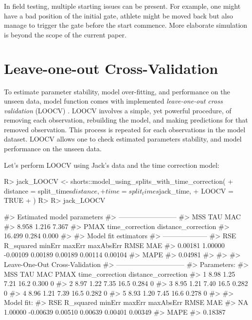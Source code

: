 \documentclass[
]{jss}
\begin{document}
In field testing, multiple starting issues can be present. For example, one might have a bad position of the initial gate, athlete might be moved back but also manage to trigger the gate before the start commence. More elaborate simulation is beyond the scope of the current paper.

\hypertarget{leave-one-out-cross-validation}{%
\section{Leave-one-out Cross-Validation}\label{leave-one-out-cross-validation}}

To estimate parameter stability, model over-fitting, and performance on the unseen data,  model function comes with implemented \emph{leave-one-out cross validation} (LOOCV) \citep{jamesIntroductionStatisticalLearning2017, jovanovicBmbstatsBootstrapMagnitudebased2020, kuhnAppliedPredictiveModeling2018}. LOOCV involves a simple, yet powerful procedure, of removing each observation, rebuilding the model, and making predictions for that removed observation. This process is repeated for each observations in the model dataset. LOOCV allows one to check estimated parameters stability, and model performance on the unseen data.

Let's perform LOOCV using Jack's data and the time correction model:

\begin{CodeChunk}
\begin{CodeInput}
R> jack_LOOCV <- shorts::model_using_splits_with_time_correction(
+   distance = split_times$distance,
+   time = split_times$jack_time,
+   LOOCV = TRUE
+ )
R> 
R> jack_LOOCV
\end{CodeInput}
\begin{CodeOutput}
#> Estimated model parameters
#> --------------------------
#>                 MSS                 TAU                 MAC 
#>               8.958               1.216               7.367 
#>                PMAX     time_correction distance_correction 
#>              16.499               0.284               0.000 
#> 
#> Model fit estimators
#> --------------------
#>       RSE R_squared    minErr    maxErr maxAbsErr      RMSE       MAE 
#>   0.00181   1.00000  -0.00109   0.00189   0.00189   0.00114   0.00104 
#>      MAPE 
#>   0.04981 
#> 
#> 
#> Leave-One-Out Cross-Validation
#> ------------------------------
#> Parameters:
#>    MSS  TAU  MAC PMAX time_correction distance_correction
#> 1 8.98 1.25 7.21 16.2           0.300                   0
#> 2 8.97 1.22 7.35 16.5           0.284                   0
#> 3 8.95 1.21 7.40 16.5           0.282                   0
#> 4 8.96 1.21 7.39 16.5           0.282                   0
#> 5 8.93 1.20 7.45 16.6           0.278                   0
#> 
#> Model fit:
#>       RSE R_squared    minErr    maxErr maxAbsErr      RMSE       MAE 
#>        NA   1.00000  -0.00639   0.00510   0.00639   0.00401   0.00349 
#>      MAPE 
#>   0.18387
\end{CodeOutput}
\end{CodeChunk}
\end{document}
